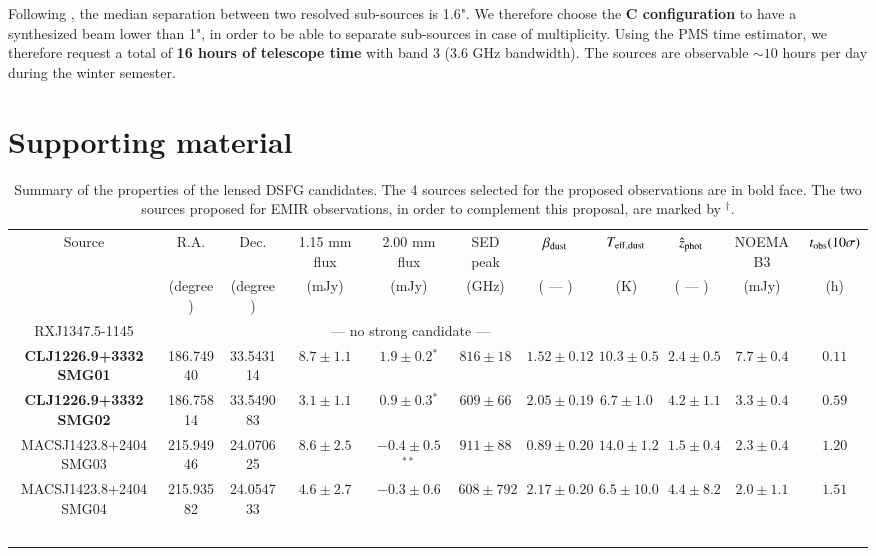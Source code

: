 \documentclass[11pt,a4paper,twoside,graphicx,color]{article}
\begin{document}
Following \cite{Simpson2015}, the median separation between two resolved sub-sources is 1.6". We therefore choose the {\bf C configuration} to have a synthesized beam lower than 1", in order to be able to separate sub-sources in case of multiplicity. Using the PMS time estimator, we therefore request a total of {\bf 16 hours of telescope time} with band 3 (3.6 GHz bandwidth). The sources are observable $\sim 10$ hours per day during the winter semester.

\newpage
\section{Supporting material}
\begin{table}[h]
\caption{\footnotesize{Summary of the properties of the lensed DSFG candidates. The 4 sources selected for the proposed observations are in bold face. The two sources proposed for EMIR observations, in order to complement this proposal, are marked by $^{\dagger}$.}}
\begin{center}
\resizebox{\columnwidth}{!} {
\begin{tabular}{c|cccc|cccccc}
\hline
\hline
Source & R.A. & Dec. & 1.15 mm flux & 2.00 mm flux & SED peak & $\beta_{\rm dust}$ & $T_{\rm eff,dust}$ & $\hat{z}_{\rm phot}$ & NOEMA B3 & $t_{\rm obs} (10 \sigma)$ \\
 & (degree) & (degree) & (mJy) & (mJy) & (GHz) & ( --- ) & (K) & ( --- ) & (mJy) & (h)\\
\hline
RXJ1347.5-1145 & \multicolumn{7}{c}{--- no strong candidate ---} \\
\hline
{\bf CLJ1226.9+3332 SMG01} & 186.74940 & 33.543114 & $8.7 \pm 1.1$ & $1.9 \pm 0.2$$^{*}$ & $816 \pm 18$ & $1.52 \pm 0.12$ & $10.3 \pm 0.5$ & $2.4 \pm 0.5$ & $7.7 \pm 0.4$ & $0.11$ \\
{\bf CLJ1226.9+3332 SMG02} & 186.75814 & 33.549083 & $3.1 \pm 1.1$ & $0.9 \pm 0.3$$^{*}$ & $609 \pm 66$ & $2.05 \pm 0.19$ & $6.7 \pm 1.0$ & $4.2 \pm 1.1$ & $3.3 \pm 0.4$ & $0.59$ \\
\hline
MACSJ1423.8+2404 SMG03 & 215.94946 & 24.070625 & $8.6 \pm 2.5$ & $-0.4 \pm 0.5$$^{**}$ & $911 \pm 88$ & $0.89 \pm 0.20$ & $14.0 \pm 1.2$ & $1.5 \pm 0.4$ & $2.3 \pm 0.4$ & $1.20$ \\
MACSJ1423.8+2404 SMG04 & 215.93582 & 24.054733 & $4.6 \pm 2.7$ & $-0.3 \pm 0.6$ & $608 \pm 792$ & $2.17 \pm 0.20$ & $6.5 \pm 10.0$ & $4.4 \pm 8.2$ & $2.0 \pm 1.1$ & $1.51$ \\
$$
\end{tabular}}
\end{center}
\end{table}
\end{document}
